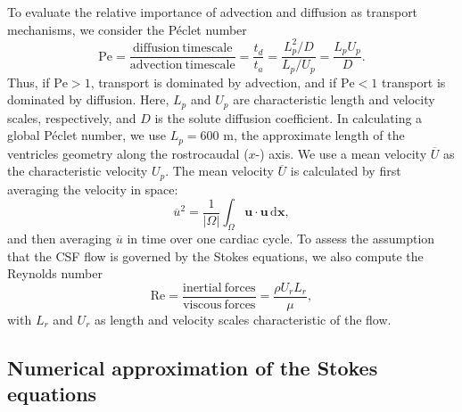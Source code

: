 \documentclass[fleqn]{wlscirep}
\newcommand{\dx}{\, \mathrm d\bm{x}}
\newcommand{\uu}{\mathbf{u}}
\begin{document}
To evaluate the relative importance of advection and
diffusion as transport mechanisms, we consider the Péclet number
\begin{equation*}
    \mathrm{Pe} = \frac{\mathrm{diffusion \ timescale}}{\mathrm{advection \ timescale}}
    = \frac{t_d}{t_a} = \frac{L_p^2/D}{L_p/U_p} = \frac{L_p U_p}{D}.
\end{equation*}
Thus, if $\mathrm{Pe} > 1$, transport is dominated by advection,
and if $\mathrm{Pe} < 1$ transport is dominated by diffusion.
Here, $L_p$ and $U_p$ are characteristic length and velocity scales,
respectively, and $D$ is the solute diffusion coefficient.
In calculating a global Péclet number, we use $L_p=600$ \textmu m, the approximate length of the
ventricles geometry along the rostrocaudal ($x$-) axis.
We use a mean velocity $\overline{U}$ as the characteristic velocity $U_p$.
The mean velocity $\overline{U}$ is calculated by first averaging the velocity in space:
\begin{equation*}
    \overline{u}^2 = \frac{1}{|\Omega|}\int_{\Omega}\uu\cdot\uu\dx,
\end{equation*}
and then averaging $\overline{u}$ in time over one cardiac cycle. To assess the assumption that the CSF flow is governed by the Stokes equations,
we also compute the Reynolds number
\begin{equation*}
    \mathrm{Re} = \frac{\mathrm{inertial \ forces}}{\mathrm{viscous \ forces}} = \frac{\rho U_r L_r}{\mu},
\end{equation*}
with $L_r$ and $U_r$ as length and velocity scales characteristic of the flow. 

\subsection*{Numerical approximation of the Stokes equations}
\end{document}
